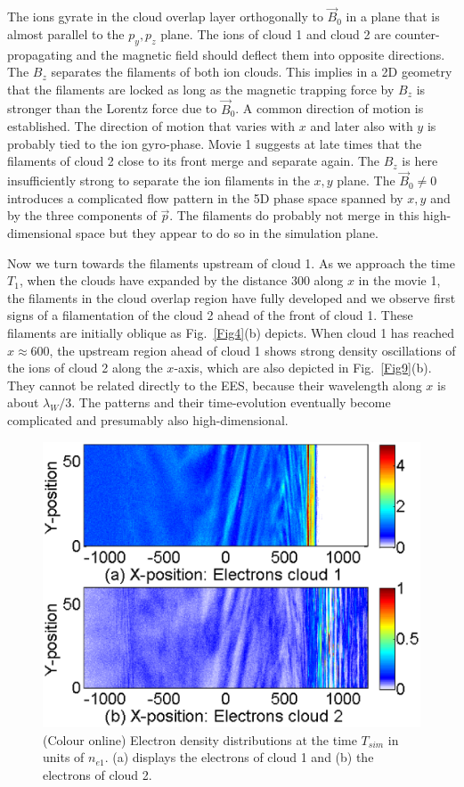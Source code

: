 \documentclass[structabstract]{aa}
\begin{document}
The ions gyrate in the cloud overlap layer orthogonally to $\vec{B}_0$ in a 
plane that is almost parallel to the $p_y,p_z$ plane. The ions of cloud 1 
and cloud 2 are counter-propagating and the magnetic field should deflect 
them into opposite directions. The $B_z$ separates the filaments of both 
ion clouds. This implies in a 2D geometry that the filaments are locked as 
long as the magnetic trapping force by $B_z$ \citep{Davidson} is stronger 
than the Lorentz force due to $\vec{B}_0$. A common direction of motion 
is established. The direction of motion that varies with $x$ and later also 
with $y$ is probably tied to the ion gyro-phase. Movie 1 suggests at late 
times that the filaments of cloud 2 close to its front merge and separate 
again. The $B_z$ is here insufficiently strong to separate the ion filaments
in the $x,y$ plane. The $\vec{B}_0 \neq 0$ introduces a complicated flow 
pattern in the 5D phase space spanned by $x,y$ and by the three components 
of $\vec{p}$. The filaments do probably not merge in this high-dimensional 
space but they appear to do so in the simulation plane. 

Now we turn towards the filaments upstream of cloud 1. As we approach the
time $T_1$, when the clouds have expanded by the distance 300 along $x$ in 
the movie 1, the filaments in the cloud overlap region have fully developed 
and we observe first signs of a filamentation of the cloud 2 ahead of the 
front of cloud 1. These filaments are initially oblique as Fig.~\ref{Fig4}(b) 
depicts. When cloud 1 has reached $x\approx 600$, the upstream region ahead 
of cloud 1 shows strong density oscillations of the ions of cloud 2 along 
the $x$-axis, which are also depicted in Fig.~\ref{Fig9}(b). They cannot be 
related directly to the EES, because their wavelength along $x$ is about 
$\lambda_W/3$. The patterns and their time-evolution eventually become 
complicated and presumably also high-dimensional.

\begin{figure}
\centering
\includegraphics[width=\columnwidth]{Fig10.eps}
\caption{(Colour online) Electron density distributions at the time $T_{sim}$
in units of $n_{e1}$. (a) displays the electrons of cloud 1 and (b) the
electrons of cloud 2.}
\label{Fig10}
\end{figure}
\end{document}
